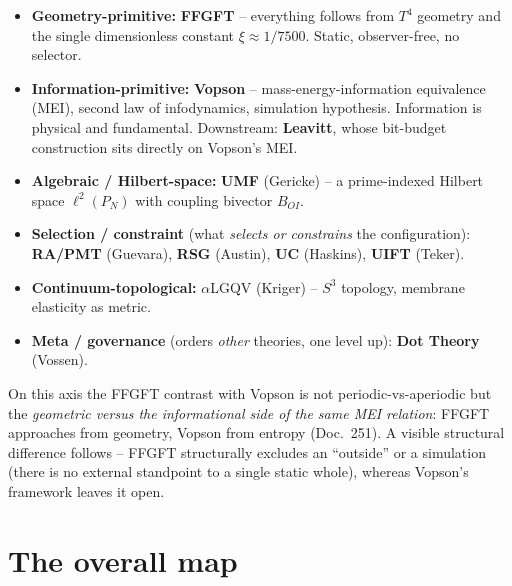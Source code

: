 \begin{itemize}
  \item \textbf{Geometry-primitive:} \textbf{FFGFT} -- everything follows from $T^4$ geometry and
        the single dimensionless constant $\xi\approx 1/7500$. Static, observer-free, no selector.
  \item \textbf{Information-primitive:} \textbf{Vopson} -- mass-energy-information equivalence
        (MEI), second law of infodynamics, simulation hypothesis. Information is physical and
        fundamental. Downstream: \textbf{Leavitt}, whose bit-budget construction sits directly on
        Vopson's MEI.
  \item \textbf{Algebraic / Hilbert-space:} \textbf{UMF} (Gericke) -- a prime-indexed Hilbert
        space $\ell^2(P_N)$ with coupling bivector $B_{OI}$.
  \item \textbf{Selection / constraint} (what \emph{selects or constrains} the configuration):
        \textbf{RA/PMT} (Guevara), \textbf{RSG} (Austin), \textbf{UC} (Haskins),
        \textbf{UIFT} (Teker).
  \item \textbf{Continuum-topological:} $\alpha$LGQV (Kriger) -- $S^3$ topology, membrane
        elasticity as metric.
  \item \textbf{Meta / governance} (orders \emph{other} theories, one level up):
        \textbf{Dot Theory} (Vossen).
\end{itemize}

On this axis the FFGFT contrast with Vopson is not periodic-vs-aperiodic but the \emph{geometric
versus the informational side of the same MEI relation}: FFGFT approaches from geometry, Vopson
from entropy (Doc.~251). A visible structural difference follows -- FFGFT structurally excludes an
\enquote{outside} or a simulation (there is no external standpoint to a single static whole),
whereas Vopson's framework leaves it open.

\section{The overall map}


